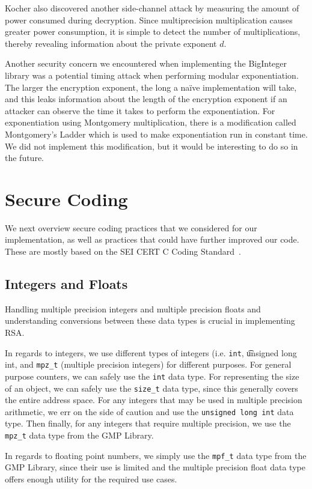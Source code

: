 \documentclass[a4paper]{article}
\begin{document}
Kocher also discovered another side-channel attack by measuring the amount of power consumed during decryption. Since multiprecision multiplication causes greater power consumption, it is simple to detect the number of multiplications, thereby revealing information about the private exponent $d$. 

Another security concern we encountered when implementing the BigInteger library was a potential timing attack when performing modular exponentiation. The larger the encryption exponent, the long a na\"{i}ve implementation will take, and this leaks information about the length of the encryption exponent if an attacker can observe the time it takes to perform the exponentiation. For exponentiation using Montgomery multiplication, there is a modification called Montgomery’s Ladder which is used to make exponentiation run in constant time. We did not implement this modification, but it would be interesting to do so in the future.
\section{Secure Coding}

We next overview secure coding practices that we considered for our implementation, as well as practices that could have further improved our code. These are mostly based on the SEI CERT C Coding Standard~\cite{seacord2008cert}.

\subsection{Integers and Floats}

Handling multiple precision integers and multiple precision floats and understanding conversions between these data types is crucial in implementing RSA.

In regards to integers, we use different types of integers (i.e. {\tt int}, {\t unsigned long int}, and {\tt mpz\_t} (multiple precision integers) for different purposes. For general purpose counters, we can safely use the {\tt int} data type. For representing the size of an object, we can safely use the {\tt size\_t} data type, since this generally covers the entire address space. For any integers that may be used in multiple precision arithmetic, we err on the side of caution
and use the {\tt unsigned long int} data type. Then finally, for any integers that require multiple precision, we use the {\tt mpz\_t} data type from the GMP Library.

In regards to floating point numbers, we simply use the {\tt mpf\_t} data type from the GMP Library, since their use is limited and the multiple precision float data type offers enough utility for the required use cases.
\end{document}
